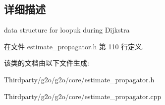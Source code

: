 \subsection{详细描述}
data structure for loopuk during Dijkstra 

在文件 estimate\-\_\-propagator.\-h 第 110 行定义.



该类的文档由以下文件生成\-:\begin{DoxyCompactItemize}
\item 
Thirdparty/g2o/g2o/core/estimate\-\_\-propagator.\-h\item 
Thirdparty/g2o/g2o/core/estimate\-\_\-propagator.\-cpp\end{DoxyCompactItemize}
